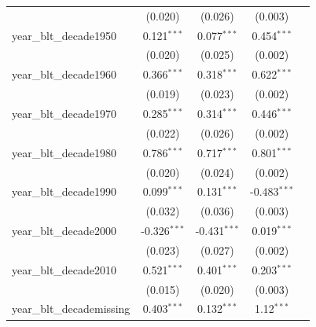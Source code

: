 \begin{tabular}{lcccc}
                                                               & (0.020)        & (0.026)        & (0.003)        &   \\   
   year\_blt\_decade1950                                       & 0.121$^{***}$  & 0.077$^{***}$  & 0.454$^{***}$  &   \\   
                                                               & (0.020)        & (0.025)        & (0.002)        &   \\   
   year\_blt\_decade1960                                       & 0.366$^{***}$  & 0.318$^{***}$  & 0.622$^{***}$  &   \\   
                                                               & (0.019)        & (0.023)        & (0.002)        &   \\   
   year\_blt\_decade1970                                       & 0.285$^{***}$  & 0.314$^{***}$  & 0.446$^{***}$  &   \\   
                                                               & (0.022)        & (0.026)        & (0.002)        &   \\   
   year\_blt\_decade1980                                       & 0.786$^{***}$  & 0.717$^{***}$  & 0.801$^{***}$  &   \\   
                                                               & (0.020)        & (0.024)        & (0.002)        &   \\   
   year\_blt\_decade1990                                       & 0.099$^{***}$  & 0.131$^{***}$  & -0.483$^{***}$ &   \\   
                                                               & (0.032)        & (0.036)        & (0.003)        &   \\   
   year\_blt\_decade2000                                       & -0.326$^{***}$ & -0.431$^{***}$ & 0.019$^{***}$  &   \\   
                                                               & (0.023)        & (0.027)        & (0.002)        &   \\   
   year\_blt\_decade2010                                       & 0.521$^{***}$  & 0.401$^{***}$  & 0.203$^{***}$  &   \\   
                                                               & (0.015)        & (0.020)        & (0.003)        &   \\   
   year\_blt\_decademissing                                    & 0.403$^{***}$  & 0.132$^{***}$  & 1.12$^{***}$   &   \\   

\end{tabular}
